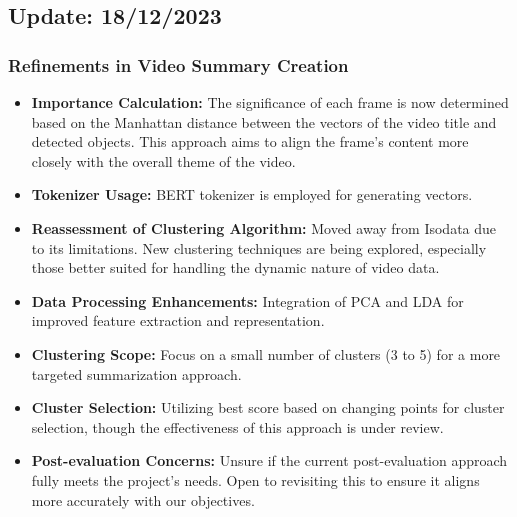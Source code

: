 \documentclass[conference]{IEEEtran}
\begin{document}
\subsection*{Update: 18/12/2023}

\subsubsection*{Refinements in Video Summary Creation}
\begin{itemize}
\item \textbf{Importance Calculation:} The significance of each frame is now determined based on the Manhattan distance between the vectors of the video title and detected objects. This approach aims to align the frame's content more closely with the overall theme of the video.
\item \textbf{Tokenizer Usage:} BERT tokenizer is employed for generating vectors.
\item \textbf{Reassessment of Clustering Algorithm:} Moved away from Isodata due to its limitations. New clustering techniques are being explored, especially those better suited for handling the dynamic nature of video data.
\item \textbf{Data Processing Enhancements:} Integration of PCA and LDA for improved feature extraction and representation.
\item \textbf{Clustering Scope:} Focus on a small number of clusters (3 to 5) for a more targeted summarization approach.
\item \textbf{Cluster Selection:} Utilizing best score based on changing points for cluster selection, though the effectiveness of this approach is under review.
\item \textbf{Post-evaluation Concerns:} Unsure if the current post-evaluation approach fully meets the project's needs. Open to revisiting this to ensure it aligns more accurately with our objectives.
\end{itemize}
\end{document}
